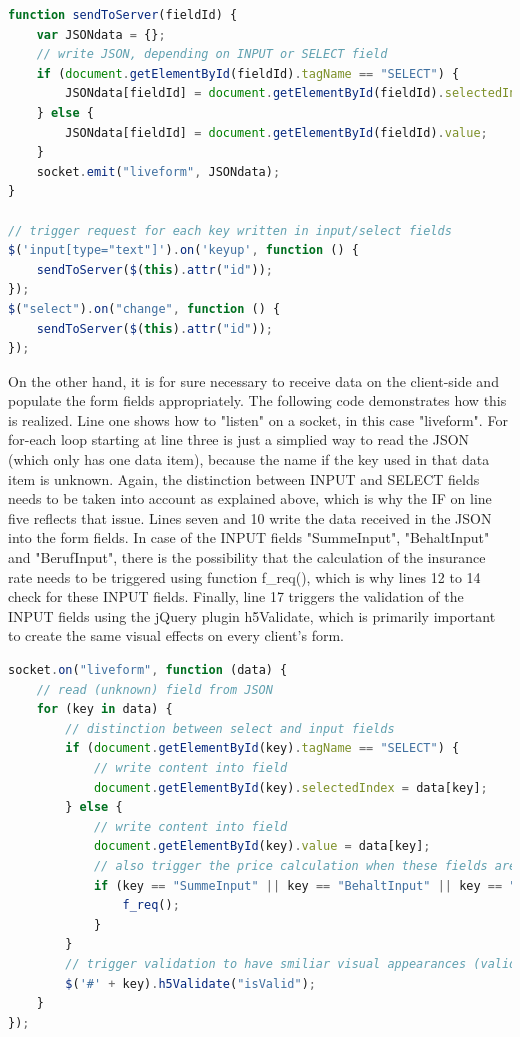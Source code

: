 \begin{lstlisting}[language=javascript,caption={Sending data to the server}]
function sendToServer(fieldId) {
    var JSONdata = {};
    // write JSON, depending on INPUT or SELECT field
    if (document.getElementById(fieldId).tagName == "SELECT") {
        JSONdata[fieldId] = document.getElementById(fieldId).selectedIndex;
    } else {
        JSONdata[fieldId] = document.getElementById(fieldId).value;
    }
    socket.emit("liveform", JSONdata);
}

// trigger request for each key written in input/select fields
$('input[type="text"]').on('keyup', function () {
    sendToServer($(this).attr("id"));
});
$("select").on("change", function () {
    sendToServer($(this).attr("id"));
});
\end{lstlisting}

On the other hand, it is for sure necessary to receive data on the client-side and populate the form fields appropriately. The following code demonstrates how this is realized. Line one shows how to "listen" on a socket, in this case "liveform". For for-each loop starting at line three is just a simplied way to read the JSON (which only has one data item), because the name if the key used in that data item is unknown. Again, the distinction between INPUT and SELECT fields needs to be taken into account as explained above, which is why the IF on line five reflects that issue. Lines seven and 10 write the data received in the JSON into the form fields. In case of the INPUT fields "SummeInput", "BehaltInput" and "BerufInput", there is the possibility that the calculation of the insurance rate needs to be triggered using function f\_req(), which is why lines 12 to 14 check for these INPUT fields. Finally, line 17 triggers the validation of the INPUT fields using the jQuery plugin h5Validate, which is primarily important to create the same visual effects on every client's form.

\begin{lstlisting}[language=javascript,caption={Receiving data using WebSockets}]
socket.on("liveform", function (data) {
    // read (unknown) field from JSON
    for (key in data) {
        // distinction between select and input fields
        if (document.getElementById(key).tagName == "SELECT") {
            // write content into field
            document.getElementById(key).selectedIndex = data[key];
        } else {
            // write content into field
            document.getElementById(key).value = data[key];
            // also trigger the price calculation when these fields are filled
            if (key == "SummeInput" || key == "BehaltInput" || key == "BerufInput") {
                f_req();
            }
        }
        // trigger validation to have smiliar visual appearances (valid/invalid) for the fields
        $('#' + key).h5Validate("isValid");
    }
});
\end{lstlisting}

